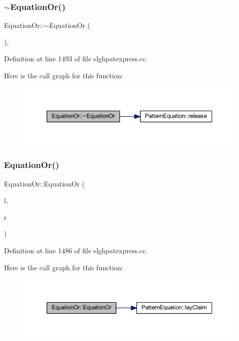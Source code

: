\subsubsection{\texorpdfstring{$\sim$EquationOr()}{~EquationOr()}}
{\footnotesize\ttfamily Equation\+Or\+::$\sim$\+Equation\+Or (\begin{DoxyParamCaption}\item[{void}]{ }\end{DoxyParamCaption})\hspace{0.3cm}{\ttfamily [protected]}, {\ttfamily [virtual]}}



Definition at line 1493 of file slghpatexpress.\+cc.

Here is the call graph for this function\+:
\nopagebreak
\begin{figure}[H]
\begin{center}
\leavevmode
\includegraphics[width=350pt]{class_equation_or_a14f865b76017432fafb982b51985c6c6_cgraph}
\end{center}
\end{figure}
\mbox{\label{class_equation_or_a43ae367817d4f9bbab54862b666e7b8b}} 
\subsubsection{\texorpdfstring{EquationOr()}{EquationOr()}}
{\footnotesize\ttfamily Equation\+Or\+::\+Equation\+Or (\begin{DoxyParamCaption}\item[{\mbox{\hyperlink{class_pattern_equation}{Pattern\+Equation}} $\ast$}]{l,  }\item[{\mbox{\hyperlink{class_pattern_equation}{Pattern\+Equation}} $\ast$}]{r }\end{DoxyParamCaption})}



Definition at line 1486 of file slghpatexpress.\+cc.

Here is the call graph for this function\+:
\nopagebreak
\begin{figure}[H]
\begin{center}
\leavevmode
\includegraphics[width=350pt]{class_equation_or_a43ae367817d4f9bbab54862b666e7b8b_cgraph}
\end{center}
\end{figure}



